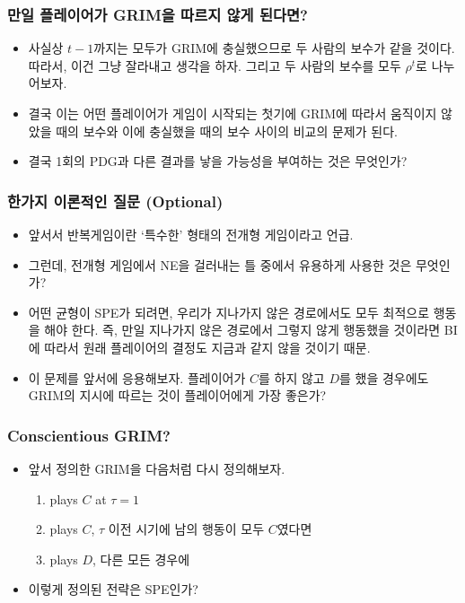 \documentclass[final]{beamer}
\begin{document}
\begin{frame}\frametitle{만일 플레이어가 GRIM을 따르지 않게 된다면?}\vspace{2em}
\begin{itemize}
\item 사실상 $t-1$까지는 모두가 GRIM에 충실했으므로 두 사람의 보수가 같을 것이다. 따라서, 이건 그냥 잘라내고 생각을 하자. 그리고 두 사람의 보수를 모두 $\rho^{t}$로 나누어보자. 
\item 결국 이는 어떤 플레이어가 게임이 시작되는 첫기에 GRIM에 따라서 움직이지 않았을 때의 보수와 이에 충실했을 때의 보수 사이의 비교의 문제가 된다. 
%
\item 결국 1회의 PDG과 다른 결과를 낳을 가능성을 부여하는 것은 무엇인가? 
\end{itemize}
\end{frame}

\begin{frame}\frametitle{한가지 이론적인 질문 (Optional)}\vspace{2em}
\begin{itemize}
\item 앞서서 반복게임이란 `특수한' 형태의 전개형 게임이라고 언급. 
\item 그런데, 전개형 게임에서 NE을 걸러내는 틀 중에서 유용하게 사용한 것은 무엇인가? 
\item 어떤 균형이 SPE가 되려면, 우리가 지나가지 않은 경로에서도 모두 최적으로 행동을 해야 한다. 즉, 만일 지나가지 않은 경로에서 그렇지 않게 행동했을 것이라면 BI에 따라서 원래 플레이어의 결정도 지금과 같지 않을 것이기 때문. 
\item 이 문제를 앞서에 응용해보자. 플레이어가 $C$를 하지 않고 $D$를 했을 경우에도 GRIM의 지시에 따르는 것이 플레이어에게 가장 좋은가? 
\end{itemize}
\end{frame}

\begin{frame}\frametitle{Conscientious GRIM?}\vspace{3em}
\begin{itemize}
\item 앞서 정의한 GRIM을 다음처럼 다시 정의해보자. 
\begin{enumerate}
		\item plays $C$ at $\tau=1$
		\item plays $C$, $\tau$ 이전 시기에 남의 행동이 모두 $C$였다면
		\item plays $D$, 다른 모든 경우에 
	\end{enumerate}
\item 이렇게 정의된 전략은 SPE인가? 
\end{itemize}
\end{frame}
\end{document}
